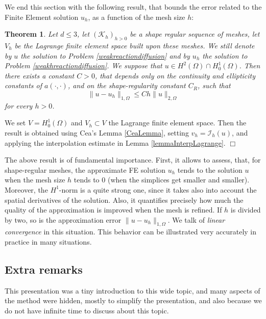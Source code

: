 \documentclass{article}
\newtheorem{theorem}{Theorem}
\begin{document}
\medskip

We end this section with the following result, that bounds the error related to the Finite Element solution $u_h$, as a function of the mesh size $h$:

\begin{theorem}
\label{thm:FEerror}
Let $d\leq3$, let $(\mathcal{K}_h)_{h>0}$ be a shape regular sequence of meshes, let $V_h$ be the Lagrange finite element space built upon these meshes. We still denote by $u$ the solution to Problem \eqref{weakreactiondiffusion} and by $u_h$ the solution to Problem \eqref{weakhreactiondiffusion}. We suppose that $u\in H^2(\Omega) \cap H^1_0(\Omega)$. Then there exists a constant $C>0$, that depends only on the continuity and ellipticity constants of $a(\cdot,\cdot)$, and on the shape-regularity constant $C_R$, such that
\[
\| u - u_h \|_{1,\Omega} \leq C h \| u \|_{2,\Omega} 
\]
for every $h>0$.
\end{theorem}

 We set $V = H^1_0(\Omega)$ and $V_h \subset V$ the Lagrange finite element space. Then the result is obtained using Cea's Lemma \ref{CeaLemma}, setting $v_h = \mathcal{I}_h(u)$, and applying the interpolation estimate in Lemma \ref{lemmaInterpLagrange}. $\Box$

\medskip

The above result is of fundamental importance. First, it allows to assess, that, for shape-regular meshes, the approximate FE solution $u_h$ tends to the solution $u$ when the mesh size $h$ tends to $0$ (when the simplices get smaller and smaller). Moreover, the $H^1$-norm is a quite strong one, since it takes also into account the spatial derivatives of the solution. Also, it quantifies precisely how much the quality of the approximation is improved when the mesh is refined. If $h$ is divided by two, so is the approximation error $\| u - u_h \|_{1,\Omega}$. We talk of \emph{linear convergence} in this situation. This behavior can be illustrated very accurately in practice in many situations.

\subsection{Extra remarks}

This presentation was a tiny introduction to this wide topic, and many aspects of the method were hidden, mostly to simplify the presentation, and also because we do not have infinite time to discuss about this topic. 
\end{document}

